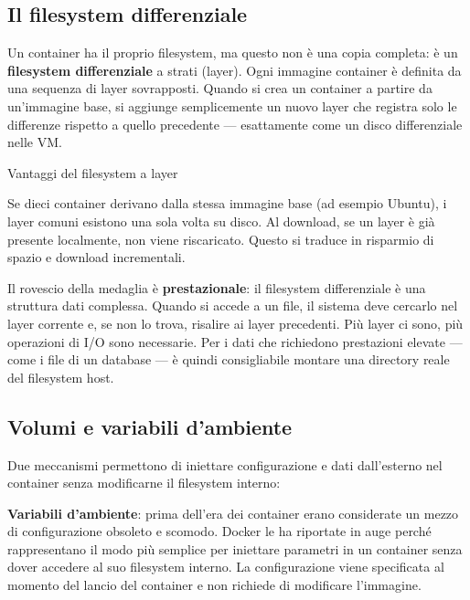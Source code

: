 \documentclass[
  italian,
  openany]{book}
\begin{document}
\subsection{Il filesystem
differenziale}\label{il-filesystem-differenziale}

Un container ha il proprio filesystem, ma questo non è una copia
completa: è un \textbf{filesystem differenziale} a strati (layer). Ogni
immagine container è definita da una sequenza di layer sovrapposti.
Quando si crea un container a partire da un'immagine base, si aggiunge
semplicemente un nuovo layer che registra solo le differenze rispetto a
quello precedente --- esattamente come un disco differenziale nelle VM.

\begin{callouttip}{Vantaggi del filesystem a layer}

Se dieci container derivano dalla stessa immagine base (ad esempio
Ubuntu), i layer comuni esistono una sola volta su disco. Al download,
se un layer è già presente localmente, non viene riscaricato. Questo si
traduce in risparmio di spazio e download incrementali.

\end{callouttip}

Il rovescio della medaglia è \textbf{prestazionale}: il filesystem
differenziale è una struttura dati complessa. Quando si accede a un
file, il sistema deve cercarlo nel layer corrente e, se non lo trova,
risalire ai layer precedenti. Più layer ci sono, più operazioni di I/O
sono necessarie. Per i dati che richiedono prestazioni elevate --- come
i file di un database --- è quindi consigliabile montare una directory
reale del filesystem host.

\subsection{Volumi e variabili
d'ambiente}\label{volumi-e-variabili-dambiente}

Due meccanismi permettono di iniettare configurazione e dati
dall'esterno nel container senza modificarne il filesystem interno:

\textbf{Variabili d'ambiente}: prima dell'era dei container erano
considerate un mezzo di configurazione obsoleto e scomodo. Docker le ha
riportate in auge perché rappresentano il modo più semplice per
iniettare parametri in un container senza dover accedere al suo
filesystem interno. La configurazione viene specificata al momento del
lancio del container e non richiede di modificare l'immagine.
\end{document}
